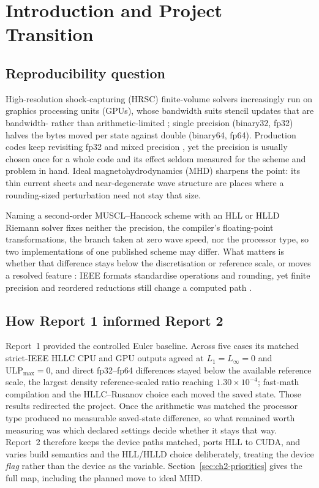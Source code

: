 
\chapter{Introduction and Project Transition}
\label{chap:introduction}

\section{Reproducibility question}

High-resolution shock-capturing (HRSC) finite-volume solvers increasingly run on
graphics processing units (GPUs), whose bandwidth suits stencil updates that are
bandwidth- rather than arithmetic-limited \citep{bard_dorelli_2014}; single
precision (binary32, fp32) halves the bytes moved per state against double
(binary64, fp64). Production codes keep revisiting fp32
and mixed precision
\citep{brogi_etal_2024,wang_xia_chen_2025,higham_mary_2022,vanaEtAl2017singlePrecision},
yet the precision is usually chosen once for a whole code and its effect seldom
measured for the scheme and problem in hand. Ideal magnetohydrodynamics (MHD)
sharpens the point: its thin current sheets and near-degenerate wave structure
are places where a rounding-sized perturbation need not stay that size.

Naming a second-order MUSCL--Hancock scheme with an HLL or HLLD Riemann solver
fixes neither the precision, the compiler's floating-point transformations, the
branch taken at zero wave speed, nor the processor type, so two implementations
of one published scheme may differ. What matters is whether that difference
stays below the discretisation or reference scale, or moves a resolved feature
\citep{plesser2018reproducibility,sandveEtAl2013reproducible}: IEEE formats
standardise operations and rounding, yet finite precision and reordered
reductions still change a computed path
\citep{ieee754_2019,goldberg_1991}.

\section{How Report 1 informed Report 2}
\label{sec:ch1-transition}

Report~1 provided the controlled Euler baseline. Across five cases its matched
strict-IEEE HLLC CPU and GPU outputs agreed at $L_1=L_\infty=0$ and
$\mathrm{ULP}_{\max}=0$, and direct fp32--fp64 differences stayed below the
available reference scale, the largest density reference-scaled ratio reaching
$1.30\times10^{-4}$; fast-math compilation and the HLLC--Rusanov choice each
moved the saved state. Those results redirected the project. Once the
arithmetic was matched the processor type produced no measurable saved-state
difference, so what remained worth measuring was which declared settings decide
whether it stays that way. Report~2 therefore keeps the device
paths matched, ports HLL to CUDA, and varies build semantics and the HLL/HLLD
choice deliberately, treating the device \emph{flag} rather than the device as
the variable. Section~\ref{sec:ch2-priorities} gives the full map, including the
planned move to ideal MHD.

